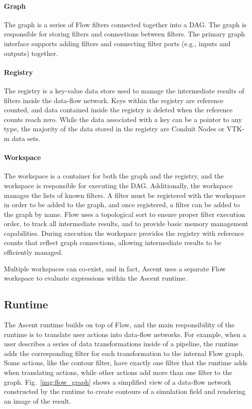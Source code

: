 \paragraph{Graph}
The graph is a series of Flow filters connected together into
a DAG.
%
The graph is responsible for storing filters and connections
between filters.
%
The primary graph interface supports adding filters and connecting
filter ports (e.g., inputs and outputs) together.

\paragraph{Registry}
The registry is a key-value data store used to manage the intermediate
results of filters inside the data-flow network.
%
Keys within the registry are reference counted, and data contained
inside the registry is deleted when the reference counts reach zero.
%
While the data associated with a key can be a pointer to any type,
the majority of the data stored in the registry are Conduit Nodes
or VTK-m data sets.


\paragraph{Workspace}
The workspace is a container for both the graph and the registry,
and the workspace is responsible for executing the DAG.
%
Additionally, the workspace manages the lists of known filters.
%
A filter must be registered with the workspace in order to be added to the
graph, and once registered, a filter can be added to the graph by name.
%
Flow uses a topological sort to ensure proper filter execution order,
to track all intermediate results, and to provide basic memory management capabilities.
During execution the workspace provides the registry with reference counts that reflect graph connections, allowing intermediate results to be efficiently managed.

%
Multiple workspaces can co-exist, and in fact, Ascent uses a separate Flow workspace
to evaluate expressions within the Ascent runtime.
%

\subsection{Runtime}
The Ascent runtime builds on top of Flow, and the main responsibility of the
runtime is to translate user actions into data-flow networks.
%
For example, when a user describes a series of data transformations inside of a pipeline,
the runtime adds the corresponding filter for each transformation to
the internal Flow graph.
%
Some actions, like the contour filter, have exactly one filter that the runtime
adds when translating actions, while other actions add more than one filter to the graph.
%
Fig.~\ref{img:flow_graph} shows a simplified view of a data-flow network constructed by the
runtime to create contours of a simulation field and rendering an image of the result.
%


